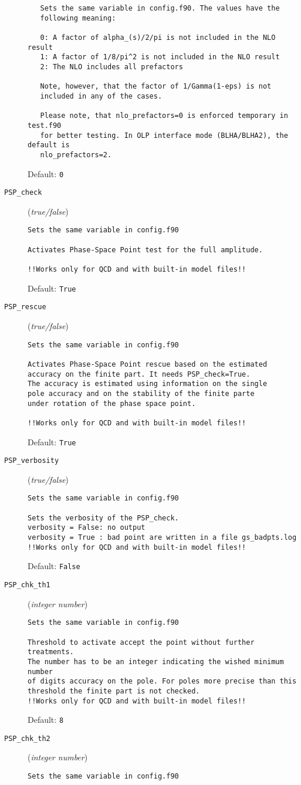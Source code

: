 \begin{description}
\begin{verbatim}
   Sets the same variable in config.f90. The values have the
   following meaning:

   0: A factor of alpha_(s)/2/pi is not included in the NLO result
   1: A factor of 1/8/pi^2 is not included in the NLO result
   2: The NLO includes all prefactors

   Note, however, that the factor of 1/Gamma(1-eps) is not
   included in any of the cases.

   Please note, that nlo_prefactors=0 is enforced temporary in test.f90
   for better testing. In OLP interface mode (BLHA/BLHA2), the default is
   nlo_prefactors=2.
\end{verbatim}
Default: \verb|0|
\item[\texttt{PSP\_check}] (\textit{true/false})
\begin{verbatim}
Sets the same variable in config.f90

Activates Phase-Space Point test for the full amplitude.

!!Works only for QCD and with built-in model files!!
\end{verbatim}
Default: \verb|True|
\item[\texttt{PSP\_rescue}] (\textit{true/false})
\begin{verbatim}
Sets the same variable in config.f90

Activates Phase-Space Point rescue based on the estimated
accuracy on the finite part. It needs PSP_check=True.
The accuracy is estimated using information on the single
pole accuracy and on the stability of the finite parte
under rotation of the phase space point.

!!Works only for QCD and with built-in model files!!
\end{verbatim}
Default: \verb|True|
\item[\texttt{PSP\_verbosity}] (\textit{true/false})
\begin{verbatim}
Sets the same variable in config.f90

Sets the verbosity of the PSP_check.
verbosity = False: no output
verbosity = True : bad point are written in a file gs_badpts.log
!!Works only for QCD and with built-in model files!!
\end{verbatim}
Default: \verb|False|
\item[\texttt{PSP\_chk\_th1}] (\textit{integer number})
\begin{verbatim}
Sets the same variable in config.f90

Threshold to activate accept the point without further treatments.
The number has to be an integer indicating the wished minimum number
of digits accuracy on the pole. For poles more precise than this
threshold the finite part is not checked.
!!Works only for QCD and with built-in model files!!
\end{verbatim}
Default: \verb|8|
\item[\texttt{PSP\_chk\_th2}] (\textit{integer number})
\begin{verbatim}
Sets the same variable in config.f90


\end{verbatim}
\end{description}

